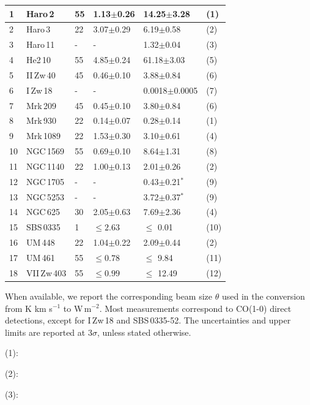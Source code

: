 \documentclass{aa}
\begin{document}
\begin{table}[t!]
\begin{threeparttable}
\begin{tabular}{p{}p{}p{}p{}p{}p{}}
\hline \hline
 1 & Haro\,2 & 55 & 1.13$\pm$0.26 & 14.25$\pm$3.28 & (1)\\
\hline
 2 & Haro\,3 & 22 & 3.07$\pm$0.29 & 6.19$\pm$0.58 & (2)\\
\hline
 3 & Haro\,11 & - & - & 1.32$\pm$0.04 & (3)\\
\hline
 4 & He2\,10 & 55 & 4.85$\pm$0.24 & 61.18$\pm$3.03 & (5)\\
\hline
 5 & II\,Zw\,40 & 45 & 0.46$\pm$0.10 & 3.88$\pm$0.84 & (6)\\
\hline
 6 & I\,Zw\,18 & - & - & 0.0018$\pm$0.0005 & (7)\\
\hline
 7 & Mrk\,209 & 45 & 0.45$\pm$0.10 & 3.80$\pm$0.84 & (6)\\
\hline
 8 & Mrk\,930 & 22 & 0.14$\pm$0.07 & 0.28$\pm$0.14 & (1)\\
\hline
 9 & Mrk\,1089 & 22 & 1.53$\pm$0.30 & 3.10$\pm$0.61 & (4)\\
\hline
 10 & NGC\,1569 & 55 & 0.69$\pm$0.10 & 8.64$\pm$1.31 & (8)\\
\hline
 11 & NGC\,1140 & 22 &  1.00$\pm$0.13 & 2.01$\pm$0.26 & (2)\\
\hline
 12 & NGC\,1705 & - & - & 0.43$\pm$0.21$^{*}$ & (9)\\
\hline
 13 & NGC\,5253 & - & - & 3.72$\pm$0.37$^{*}$ & (9)\\
\hline
 14 & NGC\,625 & 30 & 2.05$\pm$0.63 & 7.69$\pm$2.36 & (4)\\
\hline
 15 & SBS\,0335 & 1 & $\leq 2.63$ & $\leq$ 0.01 & (10)\\
\hline
 16 & UM\,448 & 22 & 1.04$\pm$0.22 & 2.09$\pm$0.44 & (2)\\
\hline
 17 & UM\,461 & 55 & $\leq 0.78$ & $\leq$ 9.84 & (11)\\
\hline
 18 & VII\,Zw\,403 & 55 & $\leq 0.99$ & $\leq$ 12.49 & (12)\\
\hline
\end{tabular}
\begin{tablenotes}
   \footnotesize
   \item When available, we report the corresponding beam size $\theta$ used in the conversion from K km s$^{-1}$ to W\,m$^{-2}$. Most measurements correspond to CO(1-0) direct detections, except for I\,Zw\,18 and SBS\,0335-52. The uncertainties and upper limits are reported at 3$\sigma$, unless stated otherwise.
   \item (1): \cite{Thronson_Bally_1987}
   \item (2): \cite{Hunt_2015}
   \item (3): \cite{Gao_Haro11_2022}

\end{tablenotes}
\end{threeparttable}
\end{table}
\end{document}
